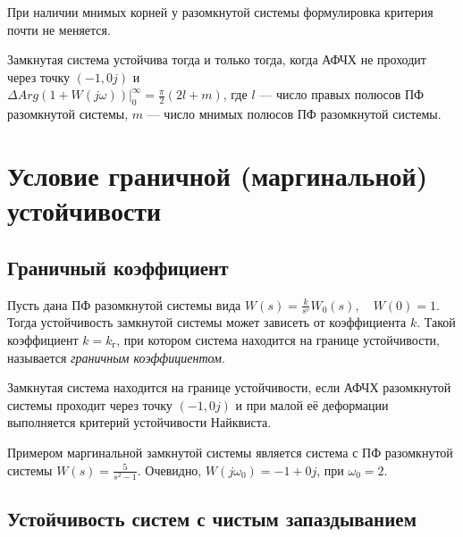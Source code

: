 \documentclass[../../TAU.tex]{subfiles}
\begin{document}
    При наличии мнимых корней у разомкнутой системы формулировка критерия почти не меняется.

    \theor[Найквист]
    Замкнутая система устойчива тогда и только тогда, когда АФЧХ не проходит через точку $(-1,0j)$ и \\
    $\left.\Delta Arg(1+W(j\omega))\right|^{\infty}_0 = \frac{\pi}{2}(2l+m)$, где $l$ --- число правых полюсов ПФ разомкнутой системы, $m$ --- число мнимых полюсов ПФ разомкнутой системы.

    \proof \cite[стр. 100]{kim:uch}

\section{Условие граничной (маргинальной) устойчивости}


\subsection{Граничный коэффициент}

    Пусть дана ПФ разомкнутой системы вида 
    $W(s) =  \frac{k}{s^v}W_0(s), \quad W(0) = 1$. 
    Тогда устойчивость замкнутой системы может зависеть от коэффициента $k$. Такой коэффициент $k=k_\text{г}$, при котором система находится на границе устойчивости, называется {\it граничным коэффициентом}.

    \begin{theor}
        Замкнутая система находится на границе устойчивости, если АФЧХ разомкнутой системы проходит через точку $(-1,0j)$ и при малой её деформации выполняется  критерий устойчивости Найквиста.
    \end{theor}
    Примером маргинальной замкнутой системы является система с ПФ разомкнутой системы $W(s) = \frac{5}{s^2-1}$. Очевидно, $W(j\omega_0) = -1+0j$, при $\omega_0 = 2$.

\subsection{Устойчивость систем с чистым запаздыванием}
\end{document}
